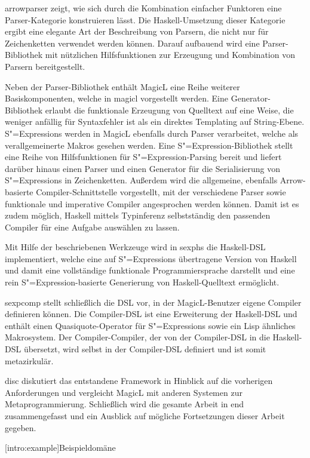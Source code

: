 \documentclass[12pt, a4paper, bibgerm]{scrbook}
\newcommand\lsection{}
\newcommand\cref{}
\newcommand{\sexp}{S"=Expression}
\newcommand{\sexps}{S"=Expressions}
\newcommand{\mprog}{Metaprogrammierung}
\begin{document}
\cref{arrowparser} zeigt, wie sich durch die Kombination einfacher
Funktoren eine Parser-Kategorie konstruieren lässt. Die
Haskell-Umsetzung dieser Kategorie ergibt eine elegante Art der
Beschreibung von Parsern, die nicht nur für Zeichenketten verwendet
werden können. Darauf aufbauend wird eine Parser-Bibliothek mit
nützlichen Hilfsfunktionen zur Erzeugung und Kombination von Parsern
bereitgestellt.

Neben der Parser-Bibliothek enthält MagicL eine Reihe weiterer
Basiskomponenten, welche in \cref{magicl} vorgestellt werden. Eine
Generator-Bibliothek erlaubt die funktionale Erzeugung von Quelltext auf
eine Weise, die weniger anfällig für Syntaxfehler ist als ein direktes
Templating auf String-Ebene. \sexps{} werden in MagicL ebenfalls durch
Parser verarbeitet, welche als verallgemeinerte Makros gesehen
werden. Eine \sexp{}-Bibliothek stellt eine Reihe von Hilfsfunktionen
für \sexp{}-Parsing bereit und liefert darüber hinaus einen Parser und
einen Generator für die Serialisierung von \sexps{} in
Zeichenketten. Außerdem wird die allgemeine, ebenfalls Arrow-basierte
Compiler-Schnittstelle vorgestellt, mit der verschiedene Parser sowie
funktionale und imperative Compiler angesprochen werden können. Damit
ist es zudem möglich, Haskell mittels Typinferenz selbstständig den passenden
Compiler für eine Aufgabe auswählen zu lassen. 

Mit Hilfe der beschriebenen Werkzeuge wird in \cref{sexphs} die
Haskell-DSL implementiert, welche eine auf \sexps{} übertragene Version
von Haskell und damit eine vollständige funktionale Programmiersprache
darstellt und eine rein \sexp{}-basierte Generierung von
Haskell-Quelltext ermöglicht.

\cref{sexpcomp} stellt schließlich die DSL vor,
in der MagicL-Benutzer eigene Compiler definieren können. Die
Compiler-DSL ist eine Erweiterung der Haskell-DSL und enthält einen
Quasiquote-Operator für \sexps{} sowie ein Lisp ähnliches
Makrosystem. Der Compiler-Compiler, der von der Compiler-DSL in die
Haskell-DSL übersetzt, wird selbst in der Compiler-DSL definiert und ist
somit metazirkulär.

\cref{disc} diskutiert das entstandene Framework in Hinblick auf die
vorherigen Anforderungen und vergleicht MagicL mit anderen Systemen zur
\mprog{}. Schließlich wird die gesamte Arbeit in \cref{end}
zusammengefasst und ein Ausblick auf mögliche Fortsetzungen dieser
Arbeit gegeben. 

\lsection[intro:example]{Beispieldomäne}
\end{document}
